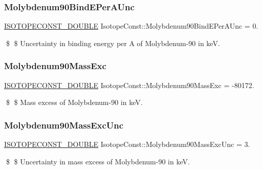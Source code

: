 \subsubsection{\texorpdfstring{Molybdenum90\+Bind\+E\+Per\+A\+Unc}{Molybdenum90BindEPerAUnc}}
{\footnotesize\ttfamily \mbox{\hyperlink{group___isotope_const-_macros_ga8f45a7272ce02c0b4c65c44636ed719a}{I\+S\+O\+T\+O\+P\+E\+C\+O\+N\+S\+T\+\_\+\+D\+O\+U\+B\+LE}} Isotope\+Const\+::\+Molybdenum90\+Bind\+E\+Per\+A\+Unc = 0.}

\$ \$ Uncertainty in binding energy per A of Molybdenum-\/90 in keV. \mbox{\label{group___isotope_const-_molybdenum-_mo90_ga88ab8fd4129903c24985da05603c4e39}} 
\subsubsection{\texorpdfstring{Molybdenum90\+Mass\+Exc}{Molybdenum90MassExc}}
{\footnotesize\ttfamily \mbox{\hyperlink{group___isotope_const-_macros_ga8f45a7272ce02c0b4c65c44636ed719a}{I\+S\+O\+T\+O\+P\+E\+C\+O\+N\+S\+T\+\_\+\+D\+O\+U\+B\+LE}} Isotope\+Const\+::\+Molybdenum90\+Mass\+Exc = -\/80172.}

\$ \$ Mass excess of Molybdenum-\/90 in keV. \mbox{\label{group___isotope_const-_molybdenum-_mo90_ga1ad04fc942d064585d8b53603f0c5fb2}} 
\subsubsection{\texorpdfstring{Molybdenum90\+Mass\+Exc\+Unc}{Molybdenum90MassExcUnc}}
{\footnotesize\ttfamily \mbox{\hyperlink{group___isotope_const-_macros_ga8f45a7272ce02c0b4c65c44636ed719a}{I\+S\+O\+T\+O\+P\+E\+C\+O\+N\+S\+T\+\_\+\+D\+O\+U\+B\+LE}} Isotope\+Const\+::\+Molybdenum90\+Mass\+Exc\+Unc = 3.}

\$ \$ Uncertainty in mass excess of Molybdenum-\/90 in keV. \mbox{\label{group___isotope_const-_molybdenum-_mo90_ga2b5a38a04bf2626dd807b7dbdab38e39}} 

